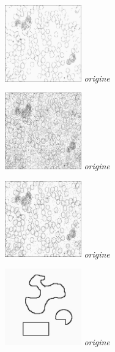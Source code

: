 \documentclass[a4,12pt]{article}
\begin{document}
\begin{minipage}[c]{0.20\linewidth}
	\begin{center}
		\includegraphics[width = 33mm]{./img/p2test_grad_fin_globules.jpg}
		\textit{origine}
	\end{center}
\end{minipage}
\begin{minipage}[c]{0.20\linewidth}
	\begin{center}
		\includegraphics[width = 33mm]{./img/p2test_grad_fin_globules_t3.jpg}
		\textit{origine}
	\end{center}
\end{minipage}
\begin{minipage}[c]{0.20\linewidth}
	\begin{center}
		\includegraphics[width = 33mm]{./img/p2test_grad_fin_globules_t5.jpg}
		\textit{origine}
	\end{center}
\end{minipage}
\begin{minipage}[c]{0.20\linewidth}
	\begin{center}
		\includegraphics[width = 33mm]{./img/p2test_grad_mean_forme2.jpg}
		\textit{origine}
	\end{center}
\end{minipage}
\end{document}
